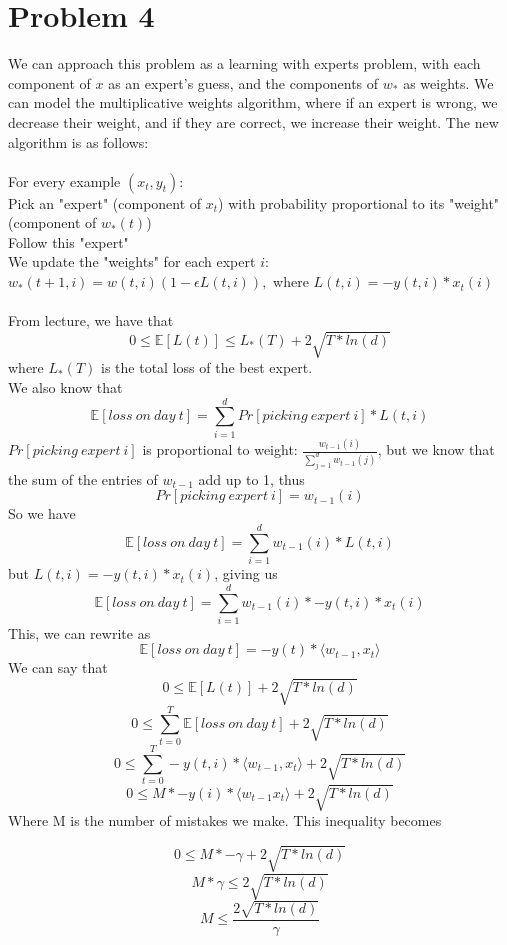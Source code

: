 \documentclass[12pt, letterpaper]{article}
\newcommand\tab[1][1cm]{\hspace*{#1}}
\begin{document}
\section{Problem 4}
We can approach this problem as a learning with experts problem, with each component of $x$ as an expert's guess, and the components of $w_*$ as weights. We can model the multiplicative weights algorithm, where if an expert is wrong, we decrease their weight, and if they are correct, we increase their weight. The new algorithm is as follows:\\\\
For every example $(x_t, y_t)$:\\
\tab Pick an "expert" (component of $x_t$) with probability proportional to \tab its "weight" (component of $w_*(t)$)\\
\tab Follow this "expert"\\
\tab We update the "weights" for each expert $i$: \\
\tab\tab$w_*(t+1,i) = w(t,i)(1-\epsilon L(t,i)),$ where $L(t,i)=-y(t,i)*x_t(i)$\\
\\
From lecture, we have that
\[0\leq\mathbb{E}[L(t)] \leq L_*(T)+2\sqrt{T*ln(d)}\]
where $L_*(T)$ is the total loss of the best expert.\\
We also know that
\[\mathbb{E}[loss\:on\:day\:t]=\sum_{i=1}^{d}Pr[picking\:expert\:i]*L(t,i)\]
$Pr[picking\:expert\:i]$ is proportional to weight: $\frac{w_{t-1}(i)}{\sum_{j=1}^{d}w_{t-1}(j)}$, but we know that the sum of the entries of $w_{t-1}$ add up to 1, thus 
\[Pr[picking\:expert\:i]=w_{t-1}(i)\]
So we have
\[\mathbb{E}[loss\:on\:day\:t]=\sum_{i=1}^{d}w_{t-1}(i)*L(t,i)\]
but $L(t,i)=-y(t,i)*x_t(i)$, giving us
\[\mathbb{E}[loss\:on\:day\:t]=\sum_{i=1}^{d}w_{t-1}(i)*-y(t,i)*x_t(i)\]
This, we can rewrite as
\[\mathbb{E}[loss\:on\:day\:t]=-y(t)*\langle w_{t-1}, x_t\rangle\]
We can say that
\[0\leq \mathbb{E}[L(t)]+2\sqrt{T*ln(d)}\]
\[0\leq \sum_{t=0}^{T}\mathbb{E}[loss\:on\:day\:t]+2\sqrt{T*ln(d)}\]
\[0\leq \sum_{t=0}^{T}-y(t,i)*\langle w_{t-1}, x_t\rangle+2\sqrt{T*ln(d)}\]
\[0\leq M*-y(i)*\langle w_{t-1} x_t\rangle+2\sqrt{T*ln(d)}\]
Where M is the number of mistakes we make. This inequality becomes

\[0\leq M*-\gamma+2\sqrt{T*ln(d)}\]
\[M*\gamma\leq2\sqrt{T*ln(d)}\]
\[M\leq\frac{2\sqrt{T*ln(d)}}{\gamma}\]
\end{document}
